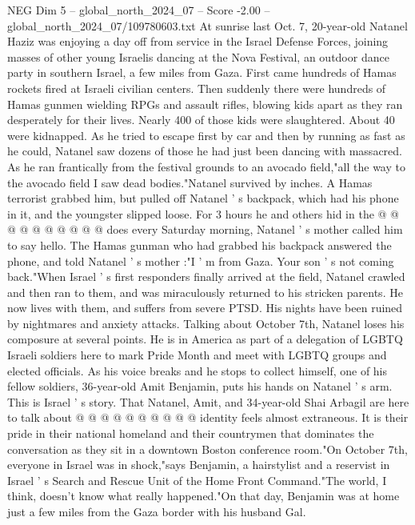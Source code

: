 \begin{textsample}{NEG Dim 5 – global\_north\_2024\_07 – Score -2.00 – global\_north\_2024\_07/109780603.txt}  \label{ex:f5_neg_150}
At sunrise last Oct. 7, 20-year-old Natanel Haziz was enjoying a day off from service in the Israel Defense Forces, joining masses of other young Israelis dancing at the Nova Festival, an outdoor dance party in southern Israel, a few miles from Gaza.
First came hundreds of Hamas rockets fired at Israeli civilian centers.
Then suddenly there were hundreds of Hamas gunmen wielding RPGs and assault rifles, blowing kids apart as they ran desperately for their lives.
Nearly 400 of those kids were slaughtered.
About 40 were kidnapped.
As he tried to escape first by car and then by running as fast as he could, Natanel saw dozens of those he had just been dancing with massacred.
As he ran frantically from the festival grounds to an avocado field,"all the way to the avocado field I saw dead bodies."Natanel survived by inches.
A Hamas terrorist grabbed him, but pulled off Natanel ' s backpack, which had his phone in it, and the youngster slipped loose.
For 3 hours he and others hid in the @ @ @ @ @ @ @ @ @ @ does every Saturday morning, Natanel ' s mother called him to say hello.
The Hamas gunman who had grabbed his backpack answered the phone, and told Natanel ' s mother :"I ' m from Gaza.
Your son ' s not coming back."When Israel ' s first responders finally arrived at the field, Natanel crawled and then ran to them, and was miraculously returned to his stricken parents.
He now lives with them, and suffers from severe PTSD.
His nights have been ruined by nightmares and anxiety attacks.
Talking about October 7th, Natanel loses his composure at several points.
He is in America as part of a delegation of LGBTQ Israeli soldiers here to mark Pride Month and meet with LGBTQ groups and elected officials.
As his voice breaks and he stops to collect himself, one of his fellow soldiers, 36-year-old Amit Benjamin, puts his hands on Natanel ' s arm.
This is Israel ' s story.
That Natanel, Amit, and 34-year-old Shai Arbagil are here to talk about @ @ @ @ @ @ @ @ @ @ identity feels almost extraneous.
It is their pride in their national homeland and their countrymen that dominates the conversation as they sit in a downtown Boston conference room."On October 7th, everyone in Israel was in shock,"says Benjamin, a hairstylist and a reservist in Israel ' s Search and Rescue Unit of the Home Front Command."The world, I think, doesn't know what really happened."On that day, Benjamin was at home just a few miles from the Gaza border with his husband Gal.

\end{textsample}
